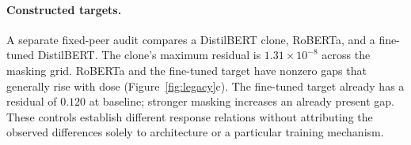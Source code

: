 \paragraph{Constructed targets.}
A separate fixed-peer audit compares a DistilBERT clone, RoBERTa, and a fine-tuned DistilBERT. The clone's maximum residual is $1.31\times10^{-8}$ across the masking grid. RoBERTa and the fine-tuned target have nonzero gaps that generally rise with dose (Figure~\ref{fig:legacy}c). The fine-tuned target already has a residual of $0.120$ at baseline; stronger masking increases an already present gap. These controls establish different response relations without attributing the observed differences solely to architecture or a particular training mechanism.



